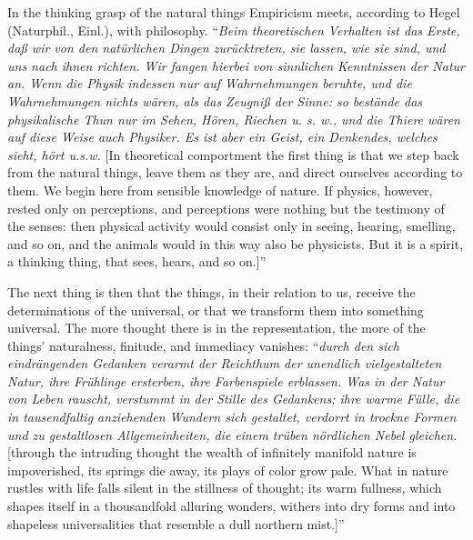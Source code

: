 \documentclass[12pt]{book}
\begin{document}
In the thinking grasp of the natural things Empiricism meets, according to Hegel (Naturphil., Einl.), with
philosophy. ``\textit{Beim theoretischen Verhalten ist das Erste, daß wir von den natürlichen Dingen
zurücktreten, sie lassen, wie sie sind, und uns nach ihnen richten. Wir fangen hierbei von sinnlichen
Kenntnissen der Natur an. Wenn die Physik indessen nur auf Wahrnehmungen beruhte, und die Wahrnehmungen
nichts wären, als das Zeugniß der Sinne: so bestände das physikalische Thun nur im Sehen, Hören, Riechen
u. s. w., und die Thiere wären auf diese Weise auch Physiker. Es ist aber ein Geist, ein Denkendes,
welches sieht, hört u.s.w.} [In theoretical comportment the first thing is that we step back from the
natural things, leave them as they are, and direct ourselves according to them. We begin here from sensible
knowledge of nature. If physics, however, rested only on perceptions, and perceptions were nothing but the
testimony of the senses: then physical activity would consist only in seeing, hearing, smelling, and so on,
and the animals would in this way also be physicists. But it is a spirit, a thinking thing, that sees,
hears, and so on.]''

The next thing is then that the things, in their relation to us, receive the determinations of the
universal, or that we transform them into something universal. The more thought there is in the
representation, the more of the things' naturalness, finitude, and immediacy vanishes: ``\textit{durch den
sich eindrängenden Gedanken verarmt der Reichthum der unendlich vielgestalteten Natur, ihre Frühlinge
ersterben, ihre Farbenspiele erblassen. Was in der Natur von Leben rauscht, verstummt in der Stille des
Gedankens; ihre warme Fülle, die in tausendfaltig anziehenden Wundern sich gestaltet, verdorrt in trockne
Formen und zu gestaltlosen Allgemeinheiten, die einem trüben nördlichen Nebel gleichen.} [through the
intruding thought the wealth of infinitely manifold nature is impoverished, its springs die away, its
plays of color grow pale. What in nature rustles with life falls silent in the stillness of thought; its
warm fullness, which shapes itself in a thousandfold alluring wonders, withers into dry forms and into
shapeless universalities that resemble a dull northern mist.]''
\end{document}
